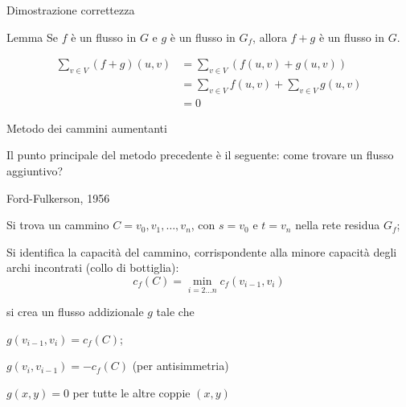 \begin{frame}{Dimostrazione correttezza}

\begin{block}{Lemma}
Se $f$ è un flusso in $G$ e $g$ è un flusso in $G_f$, allora
$f+g$ è un flusso in $G$.
\end{block}

\bigskip
{}

\begin{align*}
  \sum_{v \in V} (f+g)(u,v) &= \sum_{v \in V} (f(u,v) + g(u,v)) \\
  &= \sum_{v \in V} f(u,v) + \sum_{v \in V} g(u,v) \\
   &= 0
\end{align*}

\end{frame}

\begin{frame}{Metodo dei cammini aumentanti}

Il punto principale del metodo precedente è il seguente: come trovare un 
flusso aggiuntivo? 

\begin{center}
\end{center}

\end{frame}

\begin{frame}{Ford-Fulkerson, 1956}

\BIL
\item Si trova un cammino $C=v_0,v_1,\ldots,v_n$, con $s=v_0$ e $t=v_n$ 
  nella rete residua $G_f$; 
\item Si identifica la \alert{capacità del cammino}, corrispondente
  alla minore capacità degli archi incontrati (collo di bottiglia):
  \[
    c_f(C) = \min_{i=2 \ldots n} c_f(v_{i-1},v_i)
  \]
\item si crea un flusso addizionale $g$ tale che 
  \BI
  \item $g(v_{i-1}, v_i) = c_f(C)$;
  \item $g(v_i,v_{i-1}) = -c_f(C)$ (per antisimmetria)
  \item $g(x,y)=0$ per tutte le altre coppie $(x,y)$
  \EI
\EIL

\end{frame}

